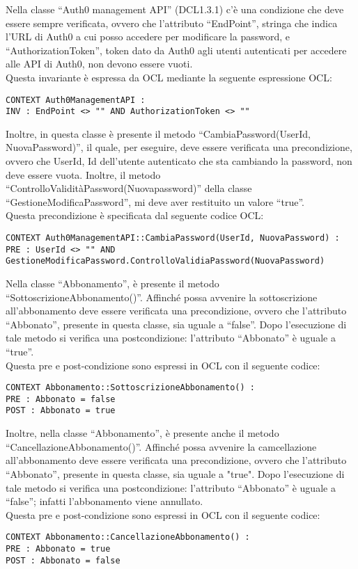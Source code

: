 \begin{listaPersonale}[OCL]{}
    Nella classe “Auth0 management API” (DCL1.3.1) c’è una condizione che deve essere sempre verificata, ovvero che l’attributo “EndPoint”, stringa che indica l’URL di Auth0 a cui posso accedere per modificare la password, e “AuthorizationToken”, token dato da Auth0 agli utenti autenticati per accedere alle API di Auth0, non devono essere vuoti. \\ 
    Questa invariante è espressa da OCL mediante la seguente espressione OCL:
    \begin{lstlisting}
CONTEXT Auth0ManagementAPI :
INV : EndPoint <> "" AND AuthorizationToken <> ""
    \end{lstlisting}
    Inoltre, in questa classe è presente il metodo “CambiaPassword(UserId, NuovaPassword)”, il quale, per eseguire, deve essere verificata una precondizione, ovvero che UserId, Id dell’utente autenticato che sta cambiando la password, non deve essere vuota. Inoltre, il metodo “ControlloValiditàPassword(Nuovapassword)” della classe “GestioneModificaPassword”, mi deve aver restituito un valore “true”.\\ Questa precondizione è specificata dal seguente codice OCL:
    \begin{lstlisting}
CONTEXT Auth0ManagementAPI::CambiaPassword(UserId, NuovaPassword) :
PRE : UserId <> "" AND GestioneModificaPassword.ControlloValidiaPassword(NuovaPassword)
    \end{lstlisting}




    Nella classe “Abbonamento”, è presente il metodo “SottoscrizioneAbbonamento()”. Affinché possa avvenire la sottoscrizione all’abbonamento deve essere verificata una precondizione, ovvero che l’attributo “Abbonato”, presente in questa classe, sia uguale a “false”. Dopo l’esecuzione di tale metodo si verifica una postcondizione: l’attributo “Abbonato” è uguale a “true”.\\
    Questa pre e post-condizione sono espressi in OCL con il seguente codice:
    \begin{lstlisting}
CONTEXT Abbonamento::SottoscrizioneAbbonamento() :
PRE : Abbonato = false
POST : Abbonato = true
    \end{lstlisting}
    Inoltre, nella classe “Abbonamento”, è presente anche il metodo “CancellazioneAbbonamento()”. Affinché possa avvenire la camcellazione all’abbonamento deve essere verificata una precondizione, ovvero che l’attributo “Abbonato”, presente in questa classe, sia uguale a "true". Dopo l’esecuzione di tale metodo si verifica una postcondizione: l’attributo “Abbonato” è uguale a “false”; infatti l'abbonamento viene annullato.\\
    Questa pre e post-condizione sono espressi in OCL con il seguente codice:
    \begin{lstlisting}
CONTEXT Abbonamento::CancellazioneAbbonamento() :
PRE : Abbonato = true
POST : Abbonato = false
    \end{lstlisting}





\end{listaPersonale}
